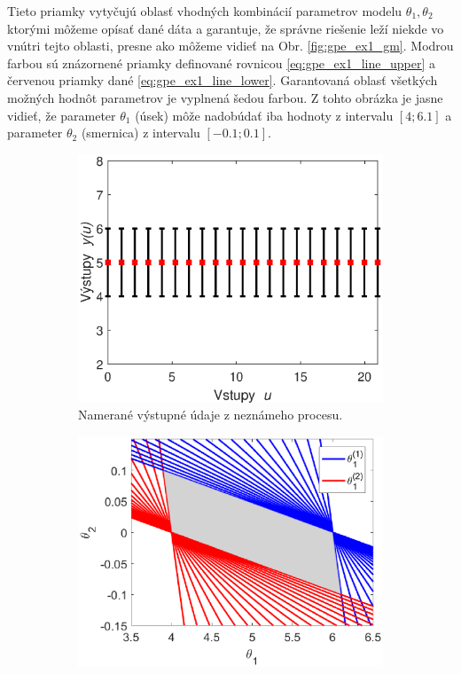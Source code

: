 Tieto priamky vytyčujú oblasť vhodných kombinácií parametrov modelu $ \theta_1, \theta_2 $ ktorými môžeme opísať dané dáta a garantuje, že správne riešenie leží niekde vo vnútri tejto oblasti, presne ako môžeme vidieť na Obr. \ref{fig:gpe_ex1_gm}. Modrou farbou sú znázornené priamky definované rovnicou \eqref{eq:gpe_ex1_line_upper} a červenou priamky dané \eqref{eq:gpe_ex1_line_lower}. Garantovaná oblasť všetkých možných hodnôt parametrov je vyplnená šedou farbou. Z tohto obrázka je jasne vidieť, že parameter $ \theta_1 $ (úsek) môže nadobúdať iba hodnoty z intervalu $ \left[4; 6.1\right] $ a parameter $ \theta_2 $ (smernica) z intervalu $ \left[-0.1; 0.1\right] $.
\begin{figure}
	\centering
	\begin{subfigure}[b]{0.48\textwidth}
		\centering
		\includegraphics[width=\linewidth]{images/gpe_ex_data1}
		\caption{Namerané výstupné údaje z neznámeho procesu.}
		\label{fig:gpe_ex1_data}
	\end{subfigure}
	\begin{subfigure}[b]{0.48\textwidth}
		\centering
		\includegraphics[width=\linewidth]{images/gpe_ex_line1}

\end{subfigure}
\end{figure}
